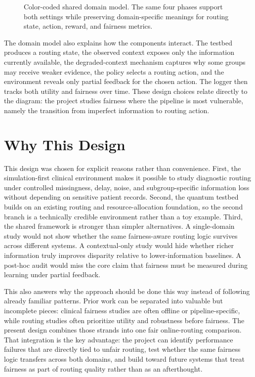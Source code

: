 \documentclass{IEEEtran}
\begin{document}
\begin{figure}[!t]
{%
}
\caption{Color-coded shared domain model. The same four phases support both settings while preserving domain-specific meanings for routing state, action, reward, and fairness metrics.}
\label{fig:domain_model}
\end{figure}

The domain model also explains how the components interact. The testbed produces a routing state, the observed context exposes only the information currently available, the degraded-context mechanism captures why some groups may receive weaker evidence, the policy selects a routing action, and the environment reveals only partial feedback for the chosen action. The logger then tracks both utility and fairness over time. These design choices relate directly to the diagram: the project studies fairness where the pipeline is most vulnerable, namely the transition from imperfect information to routing action.

\section{Why This Design}
This design was chosen for explicit reasons rather than convenience. First, the simulation-first clinical environment makes it possible to study diagnostic routing under controlled missingness, delay, noise, and subgroup-specific information loss without depending on sensitive patient records. Second, the quantum testbed builds on an existing routing and resource-allocation foundation, so the second branch is a technically credible environment rather than a toy example. Third, the shared framework is stronger than simpler alternatives. A single-domain study would not show whether the same fairness-aware routing logic survives across different systems. A contextual-only study would hide whether richer information truly improves disparity relative to lower-information baselines. A post-hoc audit would miss the core claim that fairness must be measured during learning under partial feedback.

This also answers why the approach should be done this way instead of following already familiar patterns. Prior work can be separated into valuable but incomplete pieces: clinical fairness studies are often offline or pipeline-specific, while routing studies often prioritize utility and robustness before fairness. The present design combines those strands into one fair online-routing comparison. That integration is the key advantage: the project can identify performance failures that are directly tied to unfair routing, test whether the same fairness logic transfers across both domains, and build toward future systems that treat fairness as part of routing quality rather than as an afterthought.
\end{document}
